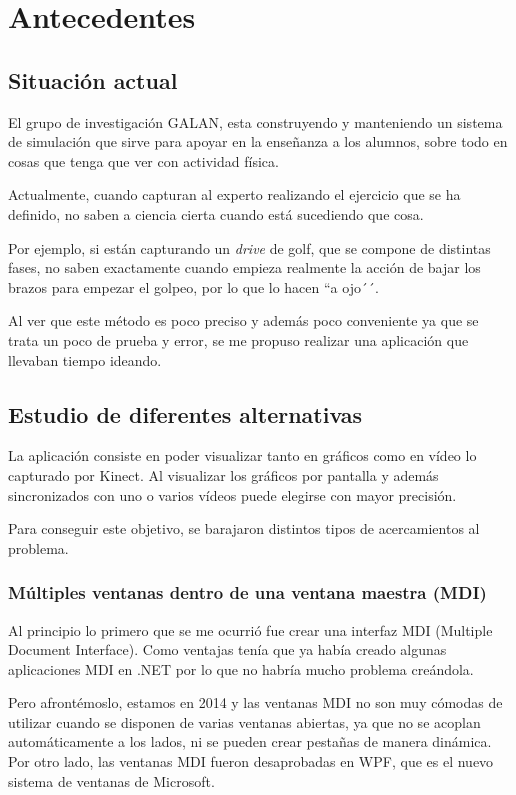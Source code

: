 \chapter{Antecedentes}

\section{Situaci\'on actual}
El grupo de investigaci\'on GALAN, esta construyendo y manteniendo un sistema de simulaci\'on que sirve para
apoyar en la ense\~nanza a los alumnos, sobre todo en cosas que tenga que ver con actividad f\'isica.

Actualmente, cuando capturan al experto realizando el ejercicio que se ha definido, no saben a ciencia cierta
cuando est\'a sucediendo que cosa.

Por ejemplo, si est\'an capturando un \emph{drive} de golf, que se compone de distintas fases, no saben exactamente
cuando empieza realmente la acci\'on de bajar los brazos para empezar el golpeo, por lo que lo hacen ``a ojo´´.

Al ver que este m\'etodo es poco preciso y adem\'as poco conveniente ya que se trata un poco de prueba y error,
se me propuso realizar una aplicaci\'on que llevaban tiempo ideando.

\section{Estudio de diferentes alternativas}
La aplicaci\'on consiste en poder visualizar tanto en gr\'aficos como en v\'ideo lo capturado por Kinect. Al visualizar
los gr\'aficos por pantalla y adem\'as sincronizados con uno o varios v\'ideos puede elegirse con mayor precisi\'on.

Para conseguir este objetivo, se barajaron distintos tipos de acercamientos al problema.

\subsection{M\'ultiples ventanas dentro de una ventana maestra (MDI)}
Al principio lo primero que se me ocurri\'o fue crear una interfaz MDI (Multiple Document Interface). Como ventajas
ten\'ia que ya hab\'ia creado algunas aplicaciones MDI en .NET por lo que no habr\'ia mucho problema cre\'andola.

Pero afront\'emoslo, estamos en 2014 y las ventanas MDI no son muy c\'omodas de utilizar cuando se disponen de varias ventanas
abiertas, ya que no se acoplan autom\'aticamente a los lados, ni se pueden crear pesta\~nas de manera din\'amica.
Por otro lado, las ventanas MDI fueron desaprobadas en WPF, que es el nuevo sistema de ventanas de Microsoft.